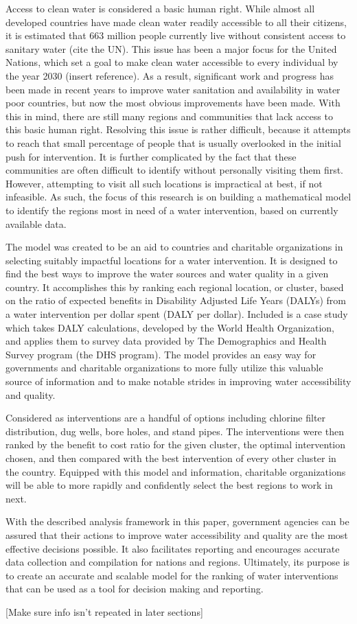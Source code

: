 Access to clean water is considered a basic human right.
While almost all developed countries have made clean water readily accessible to all their citizens, it is estimated that 663 million people currently live without consistent access to sanitary water (cite the UN).
This issue has been a major focus for the United Nations, which set a goal to make clean water accessible to every individual by the year 2030 (insert reference).
As a result, significant work and progress has been made in recent years to improve water sanitation and availability in water poor countries, but now the most obvious improvements have been made.
With this in mind, there are still many regions and communities that lack access to this basic human right.
Resolving this issue is rather difficult, because it attempts to reach that small percentage of people that is usually overlooked in the initial push for intervention.
It is further complicated by the fact that these communities are often difficult to identify without personally visiting them first.
However, attempting to visit all such locations is impractical at best, if not infeasible.
As such, the focus of this research is on building a mathematical model to identify the regions most in need of a water intervention, based on currently available data. 

The model was created to be an aid to countries and charitable organizations in selecting suitably impactful locations for a water intervention.
It is designed to find the best ways to improve the water sources and water quality in a given country.
It accomplishes this by ranking each regional location, or cluster, based on the ratio of expected benefits in Disability Adjusted Life Years (DALYs) from a water intervention per dollar spent (DALY per dollar).
Included is a case study which takes DALY calculations, developed by the World Health Organization, and applies them to survey data provided by The Demographics and Health Survey program (the DHS program).
The model provides an easy way for governments and charitable organizations to more fully utilize this valuable source of information and to make notable strides in improving water accessibility and quality.

Considered as interventions are a handful of options including chlorine filter distribution, dug wells, bore holes, and stand pipes.
The interventions were then ranked by the benefit to cost ratio for the given cluster, the optimal intervention chosen, and then compared with the best intervention of every other cluster in the country.
Equipped with this model and information, charitable organizations will be able to more rapidly and confidently select the best regions to work in next.

With the described analysis framework in this paper, government agencies can be assured that their actions to improve water accessibility and quality are the most effective decisions possible.
It also facilitates reporting and encourages accurate data collection and compilation for nations and regions.
Ultimately, its purpose is to create an accurate and scalable model for the ranking of water interventions that can be used as a tool for decision making and reporting.

[Make sure info isn't repeated in later sections]
